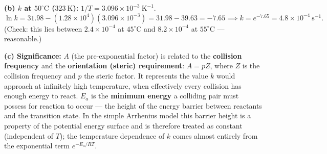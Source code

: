 \documentclass[11pt]{article}
\begin{document}
\begin{exoresolu}
\textbf{(b) $k$ at $50^\circ\mathrm{C}$ ($323\ \mathrm{K}$):} $1/T = 3.096 \times 10^{-3}\ \mathrm{K^{-1}}$.
\[ \ln k = 31.98 - (1.28 \times 10^{4})(3.096 \times 10^{-3}) = 31.98 - 39.63 = -7.65 \implies k = e^{-7.65} = \boxed{4.8 \times 10^{-4}\ \mathrm{s^{-1}}}. \]
(Check: this lies between $2.4\times 10^{-4}$ at $45^\circ\mathrm{C}$ and $8.2\times 10^{-4}$ at $55^\circ\mathrm{C}$ — reasonable.)

\textbf{(c) Significance:} $A$ (the pre-exponential factor) is related to the \textbf{collision frequency} and the \textbf{orientation (steric) requirement}: $A = pZ$, where $Z$ is the collision frequency and $p$ the steric factor. It represents the value $k$ would approach at infinitely high temperature, when effectively every collision has enough energy to react. $E_a$ is the \textbf{minimum energy} a colliding pair must possess for reaction to occur — the height of the energy barrier between reactants and the transition state. In the simple Arrhenius model this barrier height is a property of the potential energy surface and is therefore treated as constant (independent of $T$); the temperature dependence of $k$ comes almost entirely from the exponential term $e^{-E_a/RT}$.
\end{exoresolu}
\end{document}
